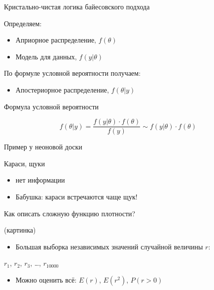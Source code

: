\documentclass[ignorenonframetext,]{beamer}
\begin{document}
\begin{frame}{Кристально-чистая логика байесовского подхода}

Определяем:

\begin{itemize}
\item
  Априорное распределение, \(f(\theta)\)
\item
  Модель для данных, \(f(y|\theta)\)
\end{itemize}

По формуле условной вероятности получаем:

\begin{itemize}
\itemsep1pt\parskip0pt
\item
  Апостериорное распределение, \(f(\theta|y)\)
\end{itemize}

\end{frame}

\begin{frame}{Формула условной вероятности}

\[
f(\theta|y)= \frac{f(y|\theta)\cdot f(\theta)}{f(y)} \sim f(y|\theta)\cdot f(\theta)
\]

\end{frame}

\begin{frame}{Пример у неоновой доски}

Караси, щуки

\begin{itemize}
\item
  нет информации
\item
  Бабушка: караси встречаются чаще щук!
\end{itemize}

\end{frame}

\begin{frame}{Как описать сложную функцию плотности?}

(картинка)

\begin{itemize}
\itemsep1pt\parskip0pt
\item
  Большая выборка независимых значений случайной величины \(r\):
\end{itemize}

\(r_1\), \(r_2\), \(r_3\), \ldots, \(r_{10000}\)

\begin{itemize}
\itemsep1pt\parskip0pt
\item
  Можно оценить всё: \(E(r)\), \(E(r^2)\), \(P(r>0)\)
\end{itemize}

\end{frame}
\end{document}
